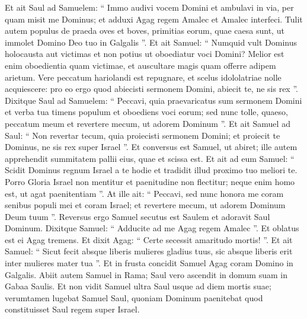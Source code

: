 \begin{biblechapter}
\begin{biblechapter}
\begin{biblechapter}
\begin{biblechapter}
\begin{biblechapter}
\begin{biblechapter}
\begin{biblechapter}
\begin{biblechapter}
\begin{biblechapter}
\begin{biblechapter}
\begin{biblechapter}
\begin{biblechapter}
\begin{biblechapter}
\begin{biblechapter}
\begin{biblechapter}
\verse Et ait Saul ad Samuelem: “ Immo audivi vocem Domini et ambulavi in via, per quam misit me Dominus; et adduxi Agag regem Amalec et Amalec interfeci. 
\verse Tulit autem populus de praeda oves et boves, primitias eorum, quae caesa sunt, ut immolet Domino Deo tuo in Galgalis ”.
 \verse Et ait Samuel: “ Numquid vult Dominus holocausta aut victimas et non potius ut oboediatur voci Domini? Melior est enim oboedientia quam victimae, et auscultare magis quam offerre adipem arietum. 
\verse Vere peccatum hariolandi est repugnare, et scelus idololatriae nolle acquiescere: pro eo ergo quod abiecisti sermonem Domini, abiecit te, ne sis rex ”.
 \verse Dixitque Saul ad Samuelem: “ Peccavi, quia praevaricatus sum sermonem Domini et verba tua timens populum et oboediens voci eorum; 
\verse sed nunc tolle, quaeso, peccatum meum et revertere mecum, ut adorem Dominum ”. 
\verse Et ait Samuel ad Saul: “ Non revertar tecum, quia proiecisti sermonem Domini; et proiecit te Dominus, ne sis rex super Israel ”. 
\verse Et conversus est Samuel, ut abiret; ille autem apprehendit summitatem pallii eius, quae et scissa est.
 \verse Et ait ad eum Samuel: “ Scidit Dominus regnum Israel a te hodie et tradidit illud proximo tuo meliori te. 
\verse Porro Gloria Israel non mentitur et paenitudine non flectitur; neque enim homo est, ut agat paenitentiam ”.
 \verse At ille ait: “ Peccavi, sed nunc honora me coram senibus populi mei et coram Israel; et revertere mecum, ut adorem Dominum Deum tuum ”. 
\verse Reversus ergo Samuel secutus est Saulem et adoravit Saul Dominum.
 \verse Dixitque Samuel: “ Adducite ad me Agag regem Amalec ”. Et oblatus est ei Agag tremens. Et dixit Agag: “ Certe secessit amaritudo mortis! ”. 
\verse Et ait Samuel: “ Sicut fecit absque liberis mulieres gladius tuus, sic absque liberis erit inter mulieres mater tua ”. Et in frusta concidit Samuel Agag coram Domino in Galgalis.
 \verse Abiit autem Samuel in Rama; Saul vero ascendit in domum suam in Gabaa Saulis. 
\verse Et non vidit Samuel ultra Saul usque ad diem mortis suae; verumtamen lugebat Samuel Saul, quoniam Dominum paenitebat quod constituisset Saul regem super Israel.
 

\end{biblechapter}
\end{biblechapter}
\end{biblechapter}
\end{biblechapter}
\end{biblechapter}
\end{biblechapter}
\end{biblechapter}
\end{biblechapter}
\end{biblechapter}
\end{biblechapter}
\end{biblechapter}
\end{biblechapter}
\end{biblechapter}
\end{biblechapter}
\end{biblechapter}
